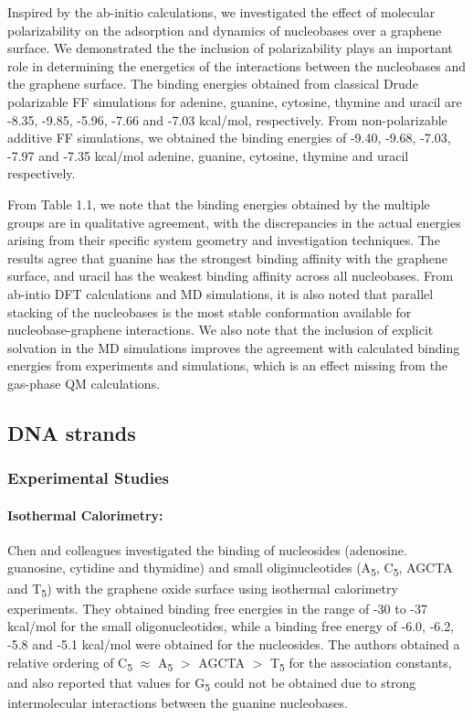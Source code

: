Inspired by the ab-initio calculations\supercite{gowtham_physisorption_2007,antony_structures_2008,umadevi_quantum_2011,cho_noncovalent_2013}, we investigated the effect of molecular polarizability on the adsorption and dynamics of nucleobases over a graphene surface.\supercite{h_polarization_2021} We demonstrated the the inclusion of polarizability plays an important role in determining the energetics of the interactions between the nucleobases and the graphene surface. The binding energies obtained from classical Drude polarizable FF simulations for adenine, guanine, cytosine, thymine and uracil are -8.35, -9.85, -5.96, -7.66 and -7.03 kcal/mol, respectively. From non-polarizable additive FF simulations, we obtained the binding energies of -9.40, -9.68, -7.03, -7.97 and -7.35 kcal/mol adenine, guanine, cytosine, thymine and uracil respectively.

From Table 1.1, we note that the binding energies obtained by the multiple groups are in qualitative agreement, with the discrepancies in the actual energies arising from their specific system geometry and investigation techniques. The results agree that guanine has the strongest binding affinity with the graphene surface, and uracil has the weakest binding affinity across all nucleobases. From ab-intio DFT calculations and MD simulations, it is also noted that parallel stacking of the nucleobases is the most stable conformation available for nucleobase-graphene interactions. We also note that the inclusion of explicit solvation in the MD simulations improves the agreement with calculated binding energies from experiments and simulations, which is an effect missing from the gas-phase QM calculations.

\subsection{DNA strands}
\subsubsection{Experimental Studies}
\paragraph{Isothermal Calorimetry:} Chen and colleagues investigated the binding of nucleosides (adenosine. guanosine, cytidine and thymidine) and small oliginucleotides (A\textsubscript{5}, C\textsubscript{5}, AGCTA and T\textsubscript{5}) with the graphene oxide surface using isothermal calorimetry experiments.\supercite{ranganathan_complex_2016} They obtained binding free energies in the range of -30 to -37 kcal/mol for the small oligonucleotides, while a binding free energy of -6.0, -6.2, -5.8 and -5.1 kcal/mol were obtained for the nucleosides. The authors obtained a relative ordering of C\textsubscript{5} $\approx$ A\textsubscript{5} $>$ AGCTA $>$ T\textsubscript{5} for the association constants, and also reported that values for G\textsubscript{5} could not be obtained due to strong intermolecular interactions between the guanine nucleobases.

